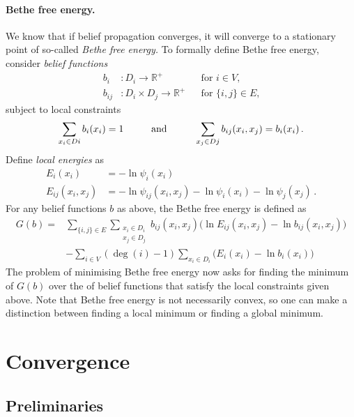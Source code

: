 \documentclass[11pt,a4paper]{article}
\theoremstyle{remark}
\newcommand{\Reals}{\mathbb{R}}
\newcommand{\range}{D}
\begin{document}
\paragraph{Bethe free energy.} We know that if belief propagation converges, it will converge to a stationary point of so-called \emph{Bethe free energy.} To formally define Bethe free energy, consider \emph{belief functions}
\begin{align*}
    b_{i} & \colon \range_i \to \Reals^+ && \text{for $i \in V$,}\\
    b_{ij} & \colon \range_i \times \range_j \to \Reals^+ && \text{for $\{i, j\} \in E$,}
\end{align*}
subject to local constraints
\[ \sum_{x_i \in \range{i}} b_i(x_i) = 1 \hspace{10mm}\text{and}\hspace{10mm} \sum_{x_j \in \range{j}} b_{ij}(x_i, x_j) = b_i(x_i)\,.\]
Define \emph{local energies} as
\begin{align*}
    E_{i}(x_i) &  = - \ln \psi_i(x_i) \\
    E_{ij}(x_i, x_j) & = - \ln \psi_{ij}(x_i, x_j) - \ln \psi_i(x_i)- \ln \psi_j(x_j)\,.
\end{align*}
For any belief functions $b$ as above, the Bethe free energy is defined as
\begin{align*}
   G(b) = & \sum_{\{i,j\}\in E} \sum_{\substack{ x_i \in \range_{i} \\ x_j \in \range_{j}}} b_{ij}(x_i,x_j) \bigl( \ln E_{ij}(x_i, x_j) - \ln b_{ij}(x_i,x_j)  \bigr) \\
   & - \sum_{i \in V} (\deg(i) - 1) \sum_{x_i \in \range_{i}} \bigl( E_{i}(x_i) - \ln b_i(x_i) \bigr)
\end{align*}
The problem of minimising Bethe free energy now asks for finding the minimum of $G(b)$ over the of belief functions that satisfy the local constraints given above. Note that Bethe free energy is not necessarily convex, so one can make a distinction between finding a local minimum or finding a global minimum.


\section{Convergence}

\subsection{Preliminaries}
\end{document}
